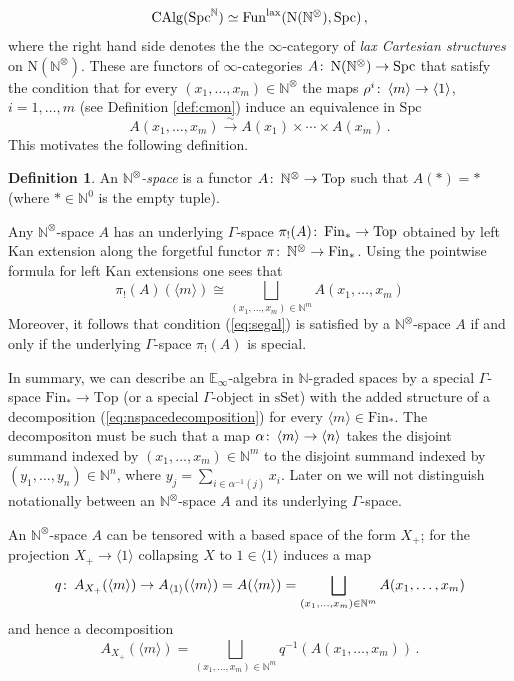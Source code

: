 \documentclass[oneside, a4paper, 12pt]{article}
\numberwithin{equation}{section}
\newcommand{\CAlg}{\mathrm{CAlg}}
\newcommand{\Spc}{\mathrm{Spc}}
\newcommand{\Topp}{\mathrm{Top}}
\newcommand{\Fin}{\mathrm{Fin}}
\newcommand{\sset}{\mathrm{sSet}}
\newcommand{\N}{\mathbb{N}}
\newcommand{\co}{\colon\thinspace}
\theoremstyle{plain}
\theoremstyle{definition}
\newtheorem{definition}[theorem]{Definition}
\theoremstyle{remark}
\begin{document}
\[
\CAlg(\Spc^\N)\simeq \mathrm{Fun}^{\textnormal{lax}}(\mathrm{N}(\N^\otimes),\Spc)\,,
\]
where the right hand side denotes the the $\infty$-category of \emph{lax Cartesian structures} on $\mathrm{N}(\N^\otimes)$. These are functors of $\infty$-categories $A\co \mathrm{N}(\N^\otimes)\to \Spc$ that satisfy the condition that for every $(x_1,\dots,x_m)\in \N^\otimes$ the maps $\rho^i\co \langle m\rangle\to \langle 1\rangle$, $i=1,\dots,m$ (see Definition \ref{def:cmon}) induce an equivalence in $\Spc$
\begin{equation} \label{eq:segal}
A(x_1,\dots,x_m) \xrightarrow{\sim} A(x_1)\times \cdots \times A(x_m)\, .
\end{equation}
This motivates the following definition.

\begin{definition} \label{def:nspace}
An \emph{$\N^\otimes$-space} is a functor $A\co \N^\otimes\to \Topp$ such that $A(\ast)=\ast$ (where $\ast \in \N^0$ is the empty tuple).
\end{definition}

Any $\N^\otimes$-space $A$ has an underlying $\Gamma$-space $\pi_{!}(A)\co \Fin_\ast\to \Topp$ obtained by left Kan extension along the forgetful functor $\pi\co \N^\otimes \to \Fin_\ast$. Using the pointwise formula for left Kan extensions one sees that
\begin{equation} \label{eq:nspacedecomposition}
\pi_{!}(A)(\langle m\rangle) \cong \bigsqcup_{(x_1,\dots,x_m)\in \N^m} A(x_1,\dots,x_m)
\end{equation}
Moreover, it follows that condition (\ref{eq:segal}) is satisfied by a $\N^\otimes$-space $A$ if and only if the underlying $\Gamma$-space $\pi_{!}(A)$ is special.

In summary, we can describe an $\mathbb{E}_\infty$-algebra in $\N$-graded spaces by a special $\Gamma$-space $\Fin_\ast\to \Topp$ (or a special $\Gamma$-object in $\sset$) with the added structure of a decomposition (\ref{eq:nspacedecomposition}) for every $\langle m\rangle\in \Fin_\ast$. The decompositon must be such that a map $\alpha\co \langle m\rangle\to \langle n\rangle$ takes the disjoint summand indexed by $(x_1,\dots,x_m)\in \N^m$ to the disjoint summand indexed by $(y_1,\dots,y_n)\in \N^n$, where $y_j=\sum_{i\in \alpha^{-1}(j)} x_i$. Later on we will not distinguish notationally between an $\N^\otimes$-space $A$ and its underlying $\Gamma$-space.



An $\N^\otimes$-space $A$ can be tensored with a based space of the form $X_+$; for the projection $X_+\to \langle 1 \rangle$ collapsing $X$ to $1\in \langle 1 \rangle$ induces a map
\[
q\co A_{X_+}(\langle m\rangle) \to A_{\langle 1 \rangle}(\langle m\rangle)=A(\langle m \rangle)=\bigsqcup_{(x_1,\dots,x_m)\in \N^m} A(x_1,\dots,x_m)
\]
and hence a decomposition
\[
A_{X_+}(\langle m\rangle)=\bigsqcup_{(x_1,\dots,x_m)\in \N^m} q^{-1}(A(x_1,\dots,x_m))\, .
\]
\end{document}
